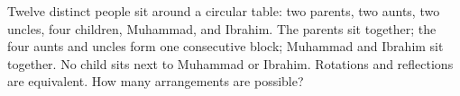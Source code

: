 Twelve distinct people sit around a circular table: two parents, two aunts, two uncles, four children, Muhammad, and Ibrahim. The parents sit together; the four aunts and uncles form one consecutive block; Muhammad and Ibrahim sit together. No child sits next to Muhammad or Ibrahim. Rotations and reflections are equivalent. How many arrangements are possible?
